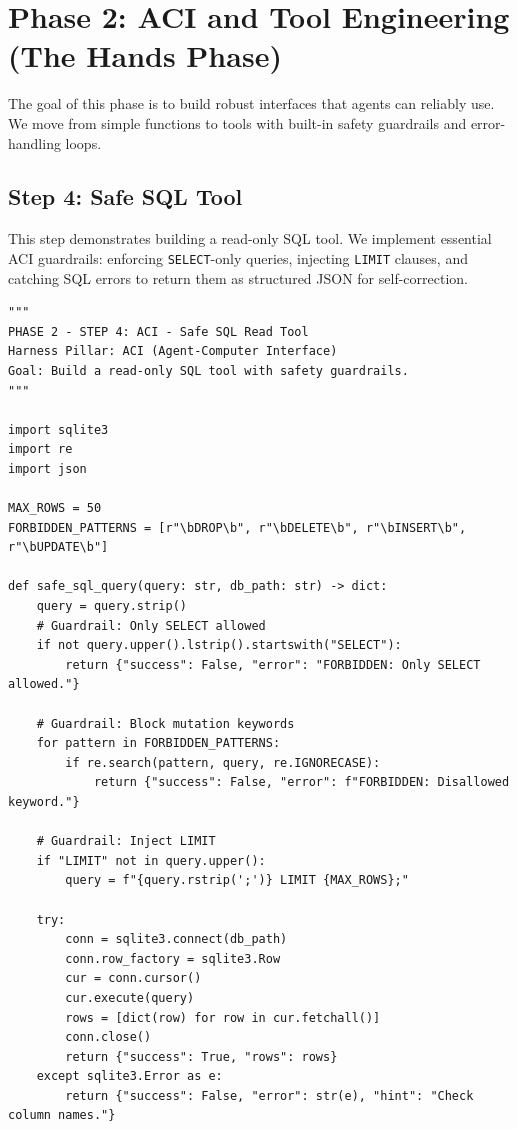 \chapter{Phase 2: ACI and Tool Engineering (The Hands Phase)}

The goal of this phase is to build robust interfaces that agents can reliably use. We move from simple functions to tools with built-in safety guardrails and error-handling loops.

\section{Step 4: Safe SQL Tool}
This step demonstrates building a read-only SQL tool. We implement essential ACI guardrails: enforcing \texttt{SELECT}-only queries, injecting \texttt{LIMIT} clauses, and catching SQL errors to return them as structured JSON for self-correction.

\begin{lstlisting}[caption={step4\_sql\_tool.py}, label={lst:step4}]
"""
PHASE 2 - STEP 4: ACI - Safe SQL Read Tool
Harness Pillar: ACI (Agent-Computer Interface)
Goal: Build a read-only SQL tool with safety guardrails.
"""

import sqlite3
import re
import json

MAX_ROWS = 50
FORBIDDEN_PATTERNS = [r"\bDROP\b", r"\bDELETE\b", r"\bINSERT\b", r"\bUPDATE\b"]

def safe_sql_query(query: str, db_path: str) -> dict:
    query = query.strip()
    # Guardrail: Only SELECT allowed
    if not query.upper().lstrip().startswith("SELECT"):
        return {"success": False, "error": "FORBIDDEN: Only SELECT allowed."}

    # Guardrail: Block mutation keywords
    for pattern in FORBIDDEN_PATTERNS:
        if re.search(pattern, query, re.IGNORECASE):
            return {"success": False, "error": f"FORBIDDEN: Disallowed keyword."}

    # Guardrail: Inject LIMIT
    if "LIMIT" not in query.upper():
        query = f"{query.rstrip(';')} LIMIT {MAX_ROWS};"

    try:
        conn = sqlite3.connect(db_path)
        conn.row_factory = sqlite3.Row
        cur = conn.cursor()
        cur.execute(query)
        rows = [dict(row) for row in cur.fetchall()]
        conn.close()
        return {"success": True, "rows": rows}
    except sqlite3.Error as e:
        return {"success": False, "error": str(e), "hint": "Check column names."}
\end{lstlisting}

